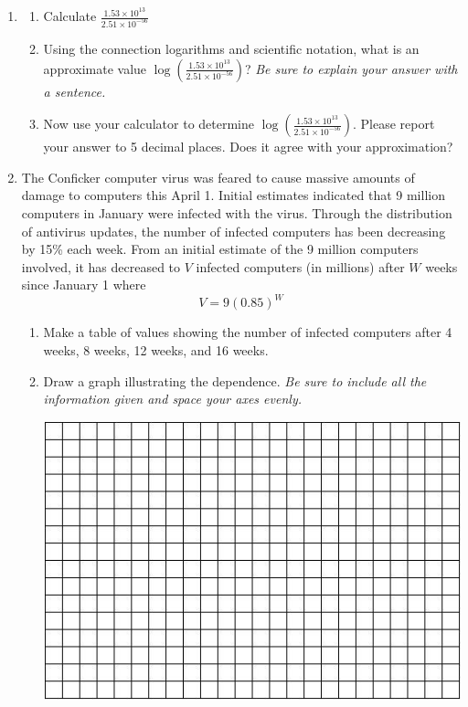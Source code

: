 \documentclass[12pt]{article}
\begin{document}
\newpage
\begin{enumerate}
\item \begin{enumerate}
\item Calculate $\displaystyle \frac{1.53 \times 10^{13}}{2.51 \times 10^{-56}} $
\vfill
\item Using the connection logarithms and scientific notation, what is an approximate value $\displaystyle \log \left( \frac{1.53 \times 10^{13}}{2.51 \times 10^{-56}} \right)$?  \emph{Be sure to explain your answer with a sentence.}
\vfill
\item Now use your calculator to determine  $\displaystyle \log \left(\frac{1.53 \times 10^{13}}{2.51 \times 10^{-56}}  \right)$. Please report your answer to 5 decimal places.  Does it agree with your approximation?
\vfill
\end{enumerate}

\newpage
\item The Conficker computer virus was feared to cause massive amounts of damage to computers this April 1.  Initial estimates indicated that 9 million computers in January were infected with the virus.  Through the distribution of antivirus updates, the number of infected computers has been decreasing by 15\% each week.  From an initial estimate of the 9 million computers involved, it has decreased to $V$ infected computers (in millions) after $W$ weeks since January 1 where $$V = 9(0.85)^W$$

\begin{enumerate}
\item Make a table of values showing the number of infected computers after 4 weeks, 8 weeks, 12 weeks, and 16 weeks.
\vfill
\item Draw a graph illustrating the dependence.  \emph{Be sure to include all the information given and space your axes evenly.}

\vspace{.1in}
\begin{center}
 {\includegraphics [width = 6in] {../GraphPaper}}
\end{center}
\vspace{.1in}


\end{enumerate}
\end{enumerate}
\end{document}
